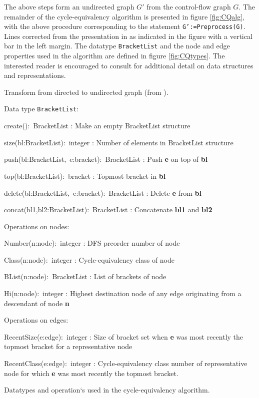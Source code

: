 \documentclass[12pt,notitlepage]{article}
\begin{document}
The above steps form an undirected graph $G'$ from the control-flow
graph $G$.  The remainder of the cycle-equivalency algorithm is
presented in figure \ref{fig:CQalg}, with the above procedure
corresponding to the statement \texttt{G':=Preprocess(G)}.
Lines corrected from the presentation in \cite{johnson93:sese} as
indicated in the figure with a vertical bar in the left margin.
The datatype \texttt{BracketList} and the node and edge properties
used in the algorithm are defined in figure \ref{fig:CQtypes}.
The interested reader is encouraged to consult \cite{johnson93:sese}
for additional detail on data structures and representations.

\begin{myfigure}
\begin{center}

\end{center}
\caption{Transform from directed to undirected graph
	 (from \cite{johnson93:sese}).}
\label{fig:CQundir}
\end{myfigure}

\begin{myfigure}\small
Data type \texttt{BracketList}:
\begin{tightdesc}
\item[create():~BracketList]
:	Make an empty BracketList structure
\item[size(bl:BracketList):~integer]
:	Number of elements in BracketList structure
\item[push(bl:BracketList,~e:bracket):~BracketList]
:	Push \textbf{e} on top of \textbf{bl}
\item[top(bl:BracketList):~bracket]
:	Topmost bracket in \textbf{bl}
\item[delete(bl:BracketList,~e:bracket):~BracketList]
:	Delete \textbf{e} from \textbf{bl}
\item[concat(bl1,bl2:BracketList):~BracketList]
:	Concatenate \textbf{bl1} and \textbf{bl2}
\end{tightdesc}

Operations on nodes:
\begin{tightdesc}
\item[Number(n:node):~integer]
:	DFS preorder number of node
\item[Class(n:node):~integer]
:	Cycle-equivalency class of node
\item[BList(n:node):~BracketList]
:	List of brackets of node
\item[Hi(n:node):~integer]
:	Highest destination node of any edge originating from a
	descendant of node \textbf{n}
\end{tightdesc}

Operations on edges:
\begin{tightdesc}
\item[RecentSize(e:edge):~integer]
:	Size of bracket set when \textbf{e} was most recently the
	topmost bracket for a representative node
\item[RecentClass(e:edge):~integer]
:	Cycle-equivalency class number of representative node for
	which \textbf{e} was most recently the topmost bracket.
\end{tightdesc}
\caption{Datatypes and operation`s used in the cycle-equivalency algorithm.}
\label{fig:CQtypes}
\end{myfigure}
\end{document}
